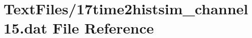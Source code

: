 \hypertarget{17time2histsim__channel15_8dat}{}\section{Text\+Files/17time2histsim\+\_\+channel15.dat File Reference}
\label{17time2histsim__channel15_8dat}
